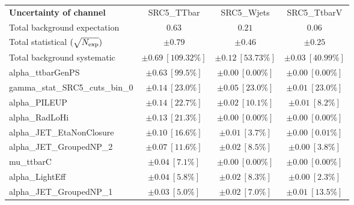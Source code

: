 
\begin{sidewaystable}
\begin{center}
\setlength{\tabcolsep}{0.0pc}
\begin{tabular*}{\textwidth}{@{\extracolsep{\fill}}lccc}
\noalign{\smallskip}\hline\noalign{\smallskip}
{\bf Uncertainty of channel}                                    & SRC5\_TTbar            & SRC5\_Wjets            & SRC5\_TtbarV            \\
\noalign{\smallskip}\hline\noalign{\smallskip}
Total background expectation             &  $0.63$        &  $0.21$        &  $0.06$       \\
\noalign{\smallskip}\hline\noalign{\smallskip}
Total statistical $(\sqrt{N_{\rm exp}})$              & $\pm 0.79$        & $\pm 0.46$        & $\pm 0.25$       \\
Total background systematic               & $\pm 0.69\ [109.32\%] $        & $\pm 0.12\ [53.73\%] $        & $\pm 0.03\ [40.99\%] $             \\
\noalign{\smallskip}\hline\noalign{\smallskip}
\noalign{\smallskip}\hline\noalign{\smallskip}
alpha\_ttbarGenPS         & $\pm 0.63\ [99.5\%] $          & $\pm 0.00\ [0.00\%] $          & $\pm 0.00\ [0.00\%] $       \\
gamma\_stat\_SRC5\_cuts\_bin\_0         & $\pm 0.14\ [23.0\%] $          & $\pm 0.05\ [23.0\%] $          & $\pm 0.01\ [23.0\%] $       \\
alpha\_PILEUP         & $\pm 0.14\ [22.7\%] $          & $\pm 0.02\ [10.1\%] $          & $\pm 0.01\ [8.2\%] $       \\
alpha\_RadLoHi         & $\pm 0.13\ [21.3\%] $          & $\pm 0.00\ [0.00\%] $          & $\pm 0.00\ [0.00\%] $       \\
alpha\_JET\_EtaNonClosure         & $\pm 0.10\ [16.6\%] $          & $\pm 0.01\ [3.7\%] $          & $\pm 0.00\ [0.01\%] $       \\
alpha\_JET\_GroupedNP\_2         & $\pm 0.07\ [11.6\%] $          & $\pm 0.02\ [8.5\%] $          & $\pm 0.00\ [3.8\%] $       \\
mu\_ttbarC         & $\pm 0.04\ [7.1\%] $          & $\pm 0.00\ [0.00\%] $          & $\pm 0.00\ [0.00\%] $       \\
alpha\_LightEff         & $\pm 0.04\ [5.8\%] $          & $\pm 0.02\ [8.3\%] $          & $\pm 0.00\ [2.3\%] $       \\
alpha\_JET\_GroupedNP\_1         & $\pm 0.03\ [5.0\%] $          & $\pm 0.02\ [7.0\%] $          & $\pm 0.01\ [13.5\%] $       \\

\end{tabular*}
\end{center}
\end{sidewaystable}
